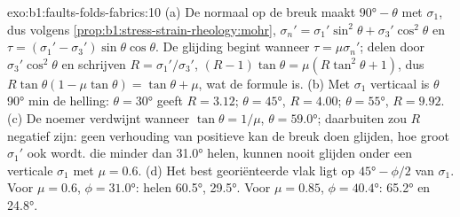 \begin{solution}{exo:b1:faults-folds-fabrics:10}
(a) De normaal op de breuk maakt $\ang{90} - \theta$ met $\sigma_1$, dus volgens
\cref{prop:b1:stress-strain-rheology:mohr},
$\sigma_n' = \sigma_1'\sin^2\theta + \sigma_3'\cos^2\theta$ en
$\tau = (\sigma_1' - \sigma_3')\sin\theta\cos\theta$. De glijding begint wanneer
$\tau = \mu\sigma_n'$; delen door $\sigma_3'\cos^2\theta$ en schrijven
$R = \sigma_1'/\sigma_3'$, $(R - 1)\tan\theta = \mu(R\tan^2\theta + 1)$, dus
$R\tan\theta(1 - \mu\tan\theta) = \tan\theta + \mu$, wat de formule is.
(b) Met $\sigma_1$ verticaal is $\theta$ \ang{90} min de helling:
$\theta = \ang{30}$ geeft $R = 3.12$; $\theta = \ang{45}$, $R = 4.00$;
$\theta = \ang{55}$, $R = 9.92$. (c) De noemer verdwijnt wanneer
$\tan\theta = 1/\mu$, $\theta = \ang{59.0}$; daarbuiten zou $R$ negatief zijn:
geen verhouding van positieve  kan de breuk doen glijden, hoe groot
$\sigma_1'$ ook wordt.  die minder dan \ang{31.0} helen, kunnen
nooit glijden onder een verticale $\sigma_1$ met $\mu = 0.6$. (d) Het best georiënteerde vlak ligt op
$\ang{45} - \phi/2$ van $\sigma_1$. Voor $\mu = 0.6$, $\phi = \ang{31.0}$:
 helen \ang{60.5},  \ang{29.5}. Voor $\mu = 0.85$,
$\phi = \ang{40.4}$: \ang{65.2} en \ang{24.8}.
\end{solution}

